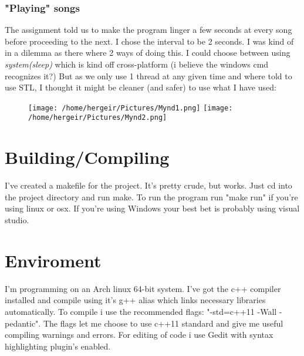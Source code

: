 \documentclass[11pt]{article}
\begin{document}
\subsubsection{"Playing" songs}
The assignment told us to make the program linger a few seconds at every song before proceeding to the next. I chose the interval to be 2 seconds. I was kind of in a dilemma as there where 2 ways of doing this. I could choose between using \emph{system(sleep)} which is kind off cross-platform (i believe the windows cmd recognizes it?) But as we only use 1 thread at any given time and where told to use STL, I thought it might be cleaner (and safer) to use what I have used:
\begin{figure}[htp]
\centering
\texttt{[image: /home/hergeir/Pictures/Mynd1.png]}
\texttt{[image: /home/hergeir/Pictures/Mynd2.png]}
\caption{}
\label{}
\end{figure}

\section{Building/Compiling}
I've created a makefile for the project. It's pretty crude, but works. 
Just cd into the project directory and run make. To run the program run "make run" if you're using linux or osx. If you're using Windows your best bet is probably using visual studio.

\section{Enviroment}
I'm programming on an Arch linux 64-bit system. I've got the c++ compiler installed and compile using it's g++ alias which links necessary libraries automatically. To compile i use the recommended flags: "-std=c++11 -Wall -pedantic". The flags let me choose to use c++11 standard and give me useful compiling warnings and errors. 
For editing of code i use Gedit with syntax highlighting plugin's enabled.
\flushright{\today}
\end{document}
